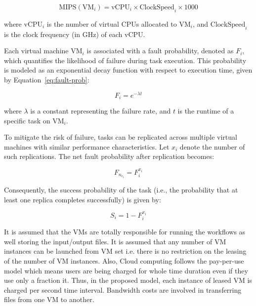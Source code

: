 \documentclass[12pt]{tcc}
\begin{document}
\begin{equation}
\text{MIPS}(\text{VM}_i) = \text{vCPU}_i \times \text{ClockSpeed}_i \times 1000
\label{eq:mips}
\end{equation}

\noindent where \( \text{vCPU}_i \) is the number of virtual CPUs allocated to \( \text{VM}_i \), and \( \text{ClockSpeed}_i \) is the clock frequency (in GHz) of each vCPU.

	Each virtual machine \( \text{VM}_i \) is associated with a fault probability, denoted as \( F_i \), which quantifies the likelihood of failure during task execution. This probability is modeled as an exponential decay function with respect to execution time, given by Equation~\eqref{eq:fault-prob}:

\begin{equation}
F_i = e^{-\lambda t}
\label{eq:fault-prob}
\end{equation}

\noindent where \( \lambda \) is a constant representing the failure rate, and \( t \) is the runtime of a specific task on \( \text{VM}_i \).

To mitigate the risk of failure, tasks can be replicated across multiple virtual machines with similar performance characteristics. Let \( x_i \) denote the number of such replications. The net fault probability after replication becomes:

\begin{equation}
F_n_e_t=F_i^{x_i}
\label{eq:net-fault}
\end{equation}

\noindent Consequently, the success probability of the task (i.e., the probability that at least one replica completes successfully) is given by:

\begin{equation}
S_i=1 - F_i^{x_i}
\label{eq:success-prob}
\end{equation}

	It is assumed that the VMs are totally responsible for running the workflows as well storing the input/output files. It is assumed that any number of VM instances can be launched from VM set i.e. there is no restriction on the leasing of the number of VM instances. Also, Cloud computing follows the pay-per-use model which means users are being charged for whole time duration even if they use only a fraction it. Thus, in the proposed model, each instance of leased VM is charged per second time interval. Bandwidth costs are involved in transferring files from one VM to another.
\end{document}

